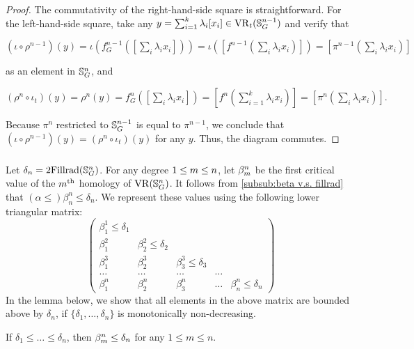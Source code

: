 \begin{proof}
	The commutativity of the right-hand-side square is straightforward.
	For the left-hand-side square, take any $y = \sum_{i=1}^k \lambda_i [x_i] \in \operatorname{VR}_t(\mathbb{S}^{n-1}_G)$ and verify that
	\begin{center}
		$(\iota \circ \rho^{n-1})(y)
		=\iota(f^{n-1}_G([\sum_i \lambda_i x_i]))
		=\iota([f^{n-1}(\sum_i \lambda_i x_i)])
		=[\pi^{n-1}(\sum_i \lambda_i x_i)]
		$
	\end{center}
	as an element in $\mathbb{S}^n_G$, and
	\begin{center}
		$(\rho^{n} \circ \iota_t)(y) = \rho^{n}(y) = f^{n}_G([\sum_i \lambda_i x_i]) = [f^{n}(\sum_{i=1}^k \lambda_i x_i)] = [\pi^{n}(\sum_i \lambda_i x_i)].
		$
	\end{center}
	Because $\pi^{n}$ restricted to $\mathbb{S}^{n-1}_G$ is equal to $\pi^{n-1}$, we conclude that $(\iota \circ \rho^{n-1})(y) = (\rho^n \circ \iota_t)(y)$ for any $y$.
	Thus, the diagram commutes.
\end{proof}

\subsubsection{}\label{subsub:foundamental_bar_rpn_lemma}

Let $\delta_n=2\mathrm{Fillrad}(\mathbb{S}^n_G)$.
For any degree $1 \leq m \leq n$, let $\beta_{m}^{n}$ be the first critical value of the $m^{\mathrm{th}}$ homology of $\operatorname{VR}(\mathbb{S}^n_G)$.
It follows from \cref{subsub:beta v.s. fillrad} that $(\alpha \leq) \beta_{n}^{n} \leq \delta_n$.
We represent these values using the following lower triangular matrix:
\[
\begin{pmatrix}
	\beta_{1}^{1}\leq \delta_1 & & &&\\
	\beta_1^2 & \beta_{2}^{2} \leq \delta_2 & &&\\
	\beta_1^3 & \beta_{2}^{3} & \beta_{3}^{3} \leq \delta_3 &&\\
	\dots & \dots & \dots & \dots &\\
	\beta_1^n & \beta_2^n & \beta_3^n & \dots & \beta_n^n \leq \delta_n
\end{pmatrix}
\]
In the lemma below, we show that all elements in the above matrix are bounded above by $\delta_n$, if $\{\delta_1, \dots, \delta_n\}$ is monotonically non-decreasing.

\medskip\lemma
If $\delta_1 \leq \dots \leq \delta_n$, then $\beta_{m}^{n} \leq \delta_n$ for any $1 \leq m \leq n$.

